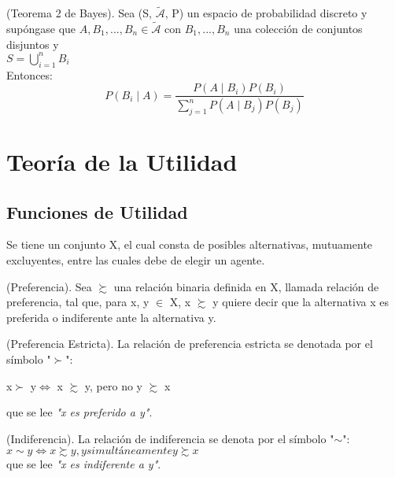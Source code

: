 \begin{thm}(Teorema 2 de Bayes). Sea (S, $\mathcal{\tilde{A}}$, P) un espacio de probabilidad discreto y supóngase que $A, B_{1},..., B_{n}\in\mathcal{\tilde{A}}$ con $B_{1},..., B_{n}$ una colección de conjuntos disjuntos y\\
	$S=\bigcup\limits_{i=1}^nB_{i}$\\
Entonces:\begin{equation}\label{bayes2}P(B_{i}\mid A)=\dfrac{P(A\mid B_{i})P(B_{i})}{\sum\limits_{j=1}^nP(A\mid B_{j})P(B_{j})}
\end{equation}
\end{thm}

\section{Teoría de la Utilidad}

\subsection{Funciones de Utilidad}

Se tiene un conjunto X, el cual consta de posibles alternativas, mutuamente excluyentes, entre las cuales debe de elegir un agente.

\begin{defn}(Preferencia). Sea $\succsim$ una relación binaria definida en X, llamada relación de preferencia, tal que, para x, y $\in$ X, x $\succsim$ y quiere decir que la alternativa x es preferida o indiferente ante la alternativa y.
	\end{defn}
	
\begin{defn}(Preferencia Estricta). La relación de preferencia estricta se denotada por el símbolo "$\succ$":
\begin{center}
		x$\succ$ y$\Leftrightarrow$ x $\succsim$ y, pero no y $\succsim$ x
\end{center}
	que se lee \textit{"x es preferido a y"}.
\end{defn}

\begin{defn}(Indiferencia). La relación de indiferencia se denota por el símbolo "$\sim$":\\
	$x \sim y \Leftrightarrow x\succsim y, y simultáneamente y\succsim x$\\
	que se lee \textit{"x es indiferente a y"}.
\end{defn}

